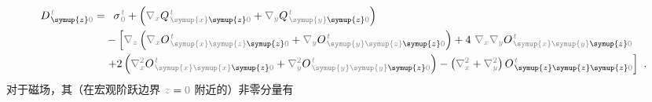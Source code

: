 \begin{subequations}
\begin{align}
	D^{\;\!\mathcolor{gray}{t}}_{\;\! \symup{z} \mathcolor{gray}{0}} = &\hphantom{+} {\sigma}^{\;\!\mathcolor{gray}{t}}_{\;\! \mathcolor{gray}{0}} + \left( \mathcolor{gray}{\nabla_x} Q^{\;\!\mathcolor{gray}{t}}_{\;\! \mathcolor{gray}{\symup{x}} \symup{z} \mathcolor{gray}{0}} + \mathcolor{gray}{\nabla_y} Q^{\;\!\mathcolor{gray}{t}}_{\;\! \mathcolor{gray}{\symup{y}} \symup{z} \mathcolor{gray}{0}} \right) \label{eq:D_z0=} \\ & - \left[ \mathcolor{gray}{\nabla_z} \left( \mathcolor{gray}{\nabla_x} O^{\;\!\mathcolor{gray}{t}}_{\;\! \mathcolor{gray}{\symup{x}} \mathcolor{gray}{\symup{z}} \symup{z} \mathcolor{gray}{0}} + \mathcolor{gray}{\nabla_y} O^{\;\!\mathcolor{gray}{t}}_{\;\! \mathcolor{gray}{\symup{y}} \mathcolor{gray}{\symup{z}} \symup{z} \mathcolor{gray}{0}} \right) + 4~ \mathcolor{gray}{\nabla_x} \mathcolor{gray}{\nabla_y} O^{\;\!\mathcolor{gray}{t}}_{\;\! \mathcolor{gray}{\symup{x}} \mathcolor{gray}{\symup{y}} \symup{z} \mathcolor{gray}{0}} \right. \\ & \left. + 2 \left( \mathcolor{gray}{\nabla_x^2} O^{\;\!\mathcolor{gray}{t}}_{\;\! \mathcolor{gray}{\symup{x}} \mathcolor{gray}{\symup{x}} \symup{z} \mathcolor{gray}{0}} + \mathcolor{gray}{\nabla_y^2} O^{\;\!\mathcolor{gray}{t}}_{\;\! \mathcolor{gray}{\symup{y}} \mathcolor{gray}{\symup{y}} \symup{z} \mathcolor{gray}{0}} \right) - \left( \mathcolor{gray}{\nabla_x^2} + \mathcolor{gray}{\nabla_y^2} \right) O^{\;\!\mathcolor{gray}{t}}_{\;\! \symup{z} \symup{z} \symup{z} \mathcolor{gray}{0}} \right] ~.
\end{align}
\end{subequations}
对于磁场，其（在宏观阶跃边界 $\mathcolor{gray}{z \mathcolor{black}{=} 0}$ 附近的）非零分量有
